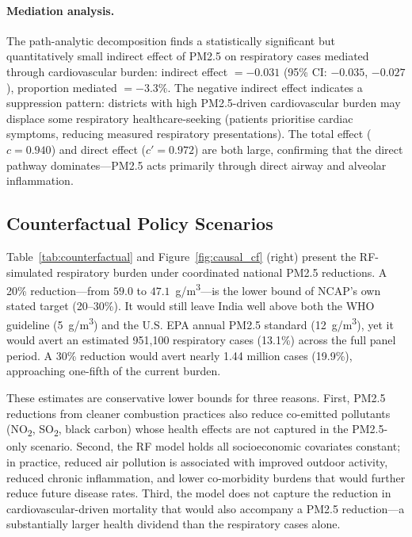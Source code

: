 \documentclass{article}
\begin{document}
\paragraph{Mediation analysis.}
The path-analytic decomposition finds a statistically significant but quantitatively small
indirect effect of PM2.5 on respiratory cases mediated through cardiovascular burden:
indirect effect $= -0.031$ (95\% CI: $-0.035$, $-0.027$), proportion mediated $= -3.3\%$.
The negative indirect effect indicates a suppression pattern: districts with
high PM2.5-driven cardiovascular burden may displace some respiratory healthcare-seeking
(patients prioritise cardiac symptoms, reducing measured respiratory presentations). The
total effect ($c = 0.940$) and direct effect ($c' = 0.972$) are both large, confirming
that the direct pathway dominates---PM2.5 acts primarily through direct airway and
alveolar inflammation.

\subsection{Counterfactual Policy Scenarios}
\label{sub:counterfactual}

Table~\ref{tab:counterfactual} and Figure~\ref{fig:causal_cf} (right) present the
RF-simulated respiratory burden under coordinated national PM2.5 reductions. A 20\%
reduction---from $59.0$ to $47.1$~\textmu{}g/m\textsuperscript{3}---is the lower
bound of NCAP's own stated target (20--30\%). It would still leave India well above both
the WHO guideline (5~\textmu{}g/m\textsuperscript{3}) and the U.S. EPA annual PM2.5
standard (12~\textmu{}g/m\textsuperscript{3}), yet it would avert an estimated 951,100
respiratory cases (13.1\%) across the full panel period. A 30\% reduction would avert
nearly 1.44 million cases (19.9\%), approaching one-fifth of the current burden.

These estimates are conservative lower bounds for three reasons. First, PM2.5 reductions
from cleaner combustion practices also reduce co-emitted pollutants (NO\textsubscript{2},
SO\textsubscript{2}, black carbon) whose health effects are not captured in the PM2.5-only
scenario. Second, the RF model holds all socioeconomic covariates constant; in practice,
reduced air pollution is associated with improved outdoor activity, reduced chronic
inflammation, and lower co-morbidity burdens that would further reduce future disease
rates. Third, the model does not capture the reduction in cardiovascular-driven mortality
that would also accompany a PM2.5 reduction---a substantially larger health dividend than
the respiratory cases alone.
\end{document}
